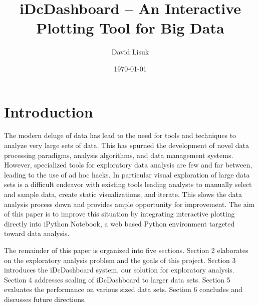 \documentclass[letter,twocolumn]{article}
\title{iDcDashboard -- An Interactive Plotting Tool for Big Data}
\author{David Lisuk}
\date{\today}
\begin{document}


\section{Introduction}%

The modern deluge of data has lead to the need for tools and techniques to analyze very large sets of data.
This has spurned the development of novel data processing paradigms\cite{dean2008mapreduce}\cite{zaharia2010spark}, analysis algorithms\cite{bekkerman2011scaling}, and data management systems\cite{tauro2012comparative}.
However, specialized tools for exploratory data analysis are few and far between, leading to the use of ad hoc hacks.
In particular visual exploration of large data sets is a difficult endeavor with existing tools leading analysts to manually select and sample data, create static visualizations, and iterate.
This slows the data analysis process down and provides ample opportunity for improvement.
The aim of this paper is to improve this situation by integrating interactive plotting directly into iPython Notebook\cite{perez2013open}, a web based Python environment targeted toward data analysis.

The remainder of this paper is organized into five sections.
Section 2 elaborates on the exploratory analysis problem and the goals of this project.
Section 3 introduces the iDcDashboard system, our solution for exploratory analysis.
Section 4 addresses scaling of iDcDashboard to larger data sets.
Section 5 evaluates the performance on various sized data sets.
Section 6 concludes and discusses future directions.
\end{document}
